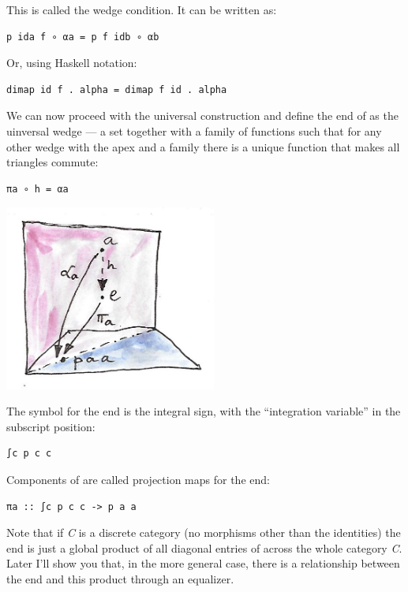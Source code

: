 This is called the wedge condition. It can be written as:

\begin{verbatim}
p ida f ∘ αa = p f idb ∘ αb
\end{verbatim}

Or, using Haskell notation:

\begin{verbatim}
dimap id f . alpha = dimap f id . alpha
\end{verbatim}

We can now proceed with the universal construction and define the end of
 as the uinversal wedge --- a set  together with a
family of functions  such that for any other wedge with the
apex  and a family  there is a unique function
 that makes all triangles commute:

\begin{verbatim}
πa ∘ h = αa
\end{verbatim}

\includegraphics[width=2.73958in]{images/end-21.jpg}

The symbol for the end is the integral sign, with the ``integration
variable'' in the subscript position:

\begin{verbatim}
∫c p c c
\end{verbatim}

Components of  are called projection maps for the end:

\begin{verbatim}
πa :: ∫c p c c -> p a a
\end{verbatim}

Note that if \emph{C} is a discrete category (no morphisms other than
the identities) the end is just a global product of all diagonal entries
of  across the whole category \emph{C}. Later I'll show you
that, in the more general case, there is a relationship between the end
and this product through an equalizer.


